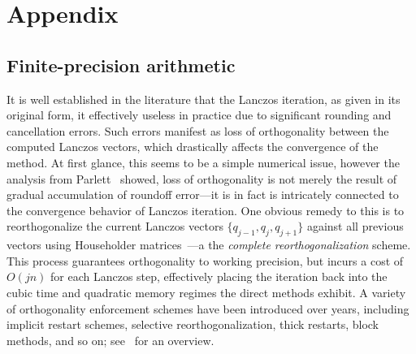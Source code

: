 \documentclass[10pt]{article}
\numberwithin{equation}{section}
\newcommand{\+}{%
	\raisebox{0.18ex}{\scaleobj{0.55}{+}}
}
\theoremstyle{definition}
\begin{document}
 

\appendix
\section{Appendix}
\subsection{Finite-precision arithmetic}\label{subsec:rounding} 
It is well established in the literature that the Lanczos iteration, as given in its original form, it effectively useless in practice due to significant rounding and cancellation errors. Such errors manifest as loss of orthogonality between the computed Lanczos vectors, which drastically affects the convergence of the method. 
At first glance, this seems to be a simple numerical issue, however the analysis from Parlett~\cite{parlett1994we} showed, loss of orthogonality is not merely the result of gradual accumulation of roundoff error---it is in fact is intricately connected to the convergence behavior of Lanczos iteration. 
One obvious remedy to this is to reorthogonalize the current Lanczos vectors $\{q_{j-1}, q_{j}, q_{j+1}\}$ against all previous vectors using Householder matrices~\cite{golub2013matrix}---a the \emph{complete reorthogonalization} scheme. This process guarantees orthogonality to working precision, but incurs a cost of $O(jn)$ for each Lanczos step, effectively placing the iteration back into the cubic time and quadratic memory regimes the direct methods exhibit. 
A variety of orthogonality enforcement schemes have been introduced over years, including implicit restart schemes, selective reorthogonalization, thick restarts, block methods, and so on; see~\cite{} for an overview.  
\end{document}
